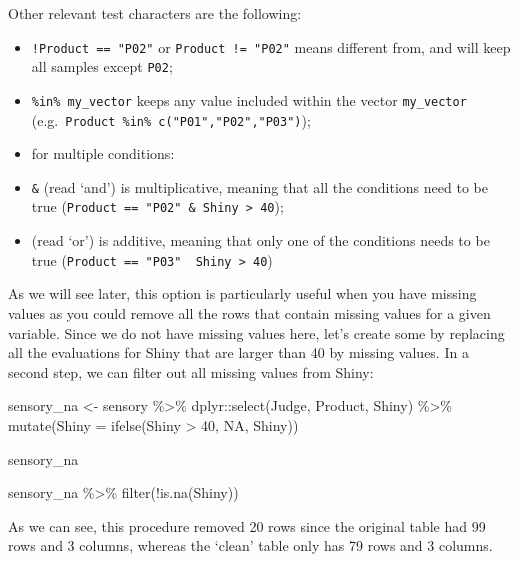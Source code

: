 \documentclass[
]{book}
\newenvironment{Shaded}{\begin{snugshade}}{\end{snugshade}}
\newcommand{\AttributeTok}[1]{\textcolor[rgb]{0.77,0.63,0.00}{#1}}
\newcommand{\ConstantTok}[1]{\textcolor[rgb]{0.00,0.00,0.00}{#1}}
\newcommand{\DecValTok}[1]{\textcolor[rgb]{0.00,0.00,0.81}{#1}}
\newcommand{\FunctionTok}[1]{\textcolor[rgb]{0.00,0.00,0.00}{#1}}
\newcommand{\NormalTok}[1]{#1}
\newcommand{\OtherTok}[1]{\textcolor[rgb]{0.56,0.35,0.01}{#1}}
\newcommand{\SpecialCharTok}[1]{\textcolor[rgb]{0.00,0.00,0.00}{#1}}
\providecommand{\tightlist}{%
  \setlength{\itemsep}{0pt}\setlength{\parskip}{0pt}}
\begin{document}
Other relevant test characters are the following:

\begin{itemize}
\tightlist
\item
  \texttt{!Product\ ==\ "P02"} or \texttt{Product\ !=\ "P02"} means different from, and will keep all samples except \texttt{P02};
\item
  \texttt{\%in\%\ my\_vector} keeps any value included within the vector \texttt{my\_vector} (e.g.~\texttt{Product\ \%in\%\ c("P01","P02","P03")});
\item
  for multiple conditions:
\item
  \texttt{\&} (read `and') is multiplicative, meaning that all the conditions need to be true (\texttt{Product\ ==\ "P02"\ \&\ Shiny\ \textgreater{}\ 40});
\item
  \texttt{\textbar{}} (read `or') is additive, meaning that only one of the conditions needs to be true (\texttt{Product\ ==\ "P03"\ \textbar{}\ Shiny\ \textgreater{}\ 40})
\end{itemize}

As we will see later, this option is particularly useful when you have missing values as you could remove all the rows that contain missing values for a given variable. Since we do not have missing values here, let's create some by replacing all the evaluations for Shiny that are larger than 40 by missing values. In a second step, we can filter out all missing values from Shiny:

\begin{Shaded}
\begin{Highlighting}[]
\NormalTok{sensory\_na }\OtherTok{\textless{}{-}}\NormalTok{ sensory }\SpecialCharTok{\%\textgreater{}\%} 
\NormalTok{  dplyr}\SpecialCharTok{::}\FunctionTok{select}\NormalTok{(Judge, Product, Shiny) }\SpecialCharTok{\%\textgreater{}\%} 
  \FunctionTok{mutate}\NormalTok{(}\AttributeTok{Shiny =} \FunctionTok{ifelse}\NormalTok{(Shiny }\SpecialCharTok{\textgreater{}} \DecValTok{40}\NormalTok{, }\ConstantTok{NA}\NormalTok{, Shiny))}

\NormalTok{sensory\_na}

\NormalTok{sensory\_na }\SpecialCharTok{\%\textgreater{}\%} 
  \FunctionTok{filter}\NormalTok{(}\SpecialCharTok{!}\FunctionTok{is.na}\NormalTok{(Shiny))}
\end{Highlighting}
\end{Shaded}

As we can see, this procedure removed 20 rows since the original table had 99 rows and 3 columns, whereas the `clean' table only has 79 rows and 3 columns.
\end{document}
